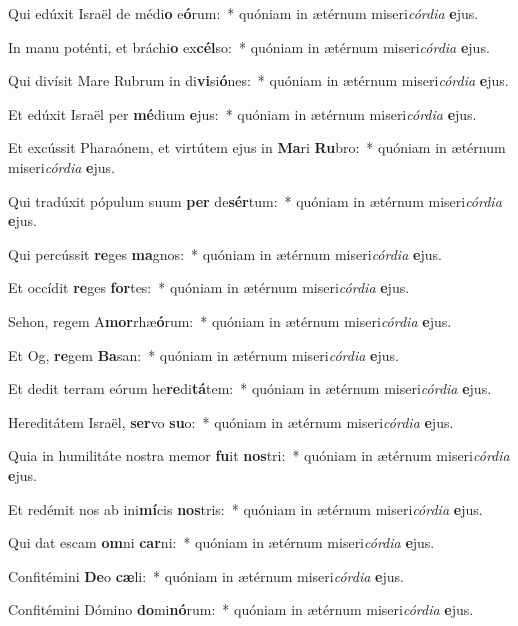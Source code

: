 \item Qui edúxit Israël de médi\textbf{o} e\textbf{ó}rum:~* quóniam in ætérnum miseri\textit{cór}\textit{di}\textit{a} \textbf{e}jus.
\item In manu poténti, et bráchi\textbf{o} ex\textbf{cél}so:~* quóniam in ætérnum miseri\textit{cór}\textit{di}\textit{a} \textbf{e}jus.
\item Qui divísit Mare Rubrum in di\textbf{vi}si\textbf{ó}nes:~* quóniam in ætérnum miseri\textit{cór}\textit{di}\textit{a} \textbf{e}jus.
\item Et edúxit Israël per \textbf{mé}dium \textbf{e}jus:~* quóniam in ætérnum miseri\textit{cór}\textit{di}\textit{a} \textbf{e}jus.
\item Et excússit Pharaónem, et virtútem ejus in \textbf{Ma}ri \textbf{Ru}bro:~* quóniam in ætérnum miseri\textit{cór}\textit{di}\textit{a} \textbf{e}jus.
\item Qui tradúxit pópulum suum \textbf{per} de\textbf{sér}tum:~* quóniam in ætérnum miseri\textit{cór}\textit{di}\textit{a} \textbf{e}jus.
\item Qui percússit \textbf{re}ges \textbf{ma}gnos:~* quóniam in ætérnum miseri\textit{cór}\textit{di}\textit{a} \textbf{e}jus.
\item Et occídit \textbf{re}ges \textbf{for}tes:~* quóniam in ætérnum miseri\textit{cór}\textit{di}\textit{a} \textbf{e}jus.
\item Sehon, regem A\textbf{mor}rhæ\textbf{ó}rum:~* quóniam in ætérnum miseri\textit{cór}\textit{di}\textit{a} \textbf{e}jus.
\item Et Og, \textbf{re}gem \textbf{Ba}san:~* quóniam in ætérnum miseri\textit{cór}\textit{di}\textit{a} \textbf{e}jus.
\item Et dedit terram eórum he\textbf{re}di\textbf{tá}tem:~* quóniam in ætérnum miseri\textit{cór}\textit{di}\textit{a} \textbf{e}jus.
\item Hereditátem Israël, \textbf{ser}vo \textbf{su}o:~* quóniam in ætérnum miseri\textit{cór}\textit{di}\textit{a} \textbf{e}jus.
\item Quia in humilitáte nostra memor \textbf{fu}it \textbf{nos}tri:~* quóniam in ætérnum miseri\textit{cór}\textit{di}\textit{a} \textbf{e}jus.
\item Et redémit nos ab ini\textbf{mí}cis \textbf{nos}tris:~* quóniam in ætérnum miseri\textit{cór}\textit{di}\textit{a} \textbf{e}jus.
\item Qui dat escam \textbf{om}ni \textbf{car}ni:~* quóniam in ætérnum miseri\textit{cór}\textit{di}\textit{a} \textbf{e}jus.
\item Confitémini \textbf{De}o \textbf{cæ}li:~* quóniam in ætérnum miseri\textit{cór}\textit{di}\textit{a} \textbf{e}jus.
\item Confitémini Dómino \textbf{do}mi\textbf{nó}rum:~* quóniam in ætérnum miseri\textit{cór}\textit{di}\textit{a} \textbf{e}jus.
